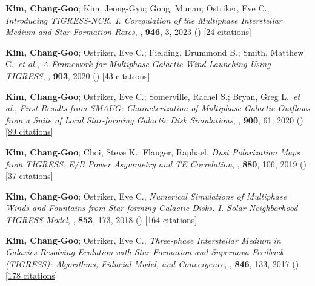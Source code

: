 \item[{51.}]\textbf{Kim, Chang-Goo}; Kim, Jeong-Gyu; Gong, Munan; Ostriker, Eve C., \textit{Introducing TIGRESS-NCR. I. Coregulation of the Multiphase Interstellar Medium and Star Formation Rates}, , \textbf{946}, 3, 2023 () [\href{http://adsabs.harvard.edu/abs/2023ApJ...946....3K}{24 citations}]

\item[{50.}]\textbf{Kim, Chang-Goo}; Ostriker, Eve C.; Fielding, Drummond B.; Smith, Matthew C.~\textit{et al.}, \textit{A Framework for Multiphase Galactic Wind Launching Using TIGRESS}, , \textbf{903}, 2020 () [\href{http://adsabs.harvard.edu/abs/2020ApJ...903L..34K}{43 citations}]

\item[{49.}]\textbf{Kim, Chang-Goo}; Ostriker, Eve C.; Somerville, Rachel S.; Bryan, Greg L.~\textit{et al.}, \textit{First Results from SMAUG: Characterization of Multiphase Galactic Outflows from a Suite of Local Star-forming Galactic Disk Simulations}, , \textbf{900}, 61, 2020 () [\href{http://adsabs.harvard.edu/abs/2020ApJ...900...61K}{89 citations}]

\item[{48.}]\textbf{Kim, Chang-Goo}; Choi, Steve K.; Flauger, Raphael, \textit{Dust Polarization Maps from TIGRESS: E/B Power Asymmetry and TE Correlation}, , \textbf{880}, 106, 2019 () [\href{http://adsabs.harvard.edu/abs/2019ApJ...880..106K}{37 citations}]

\item[{47.}]\textbf{Kim, Chang-Goo}; Ostriker, Eve C., \textit{Numerical Simulations of Multiphase Winds and Fountains from Star-forming Galactic Disks. I. Solar Neighborhood TIGRESS Model}, , \textbf{853}, 173, 2018 () [\href{http://adsabs.harvard.edu/abs/2018ApJ...853..173K}{164 citations}]

\item[{46.}]\textbf{Kim, Chang-Goo}; Ostriker, Eve C., \textit{Three-phase Interstellar Medium in Galaxies Resolving Evolution with Star Formation and Supernova Feedback (TIGRESS): Algorithms, Fiducial Model, and Convergence}, , \textbf{846}, 133, 2017 () [\href{http://adsabs.harvard.edu/abs/2017ApJ...846..133K}{178 citations}]


